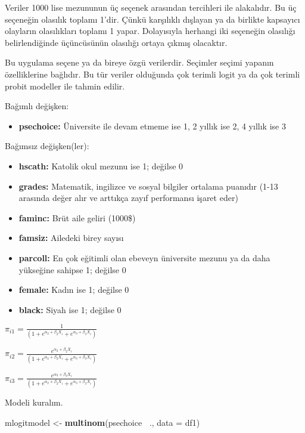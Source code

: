 \documentclass[
]{book}
\newenvironment{Shaded}{\begin{snugshade}}{\end{snugshade}}
\newcommand{\DataTypeTok}[1]{\textcolor[rgb]{0.13,0.29,0.53}{#1}}
\newcommand{\KeywordTok}[1]{\textcolor[rgb]{0.13,0.29,0.53}{\textbf{#1}}}
\newcommand{\NormalTok}[1]{#1}
\newcommand{\OperatorTok}[1]{\textcolor[rgb]{0.81,0.36,0.00}{\textbf{#1}}}
\newcommand{\StringTok}[1]{\textcolor[rgb]{0.31,0.60,0.02}{#1}}
\providecommand{\tightlist}{%
  \setlength{\itemsep}{0pt}\setlength{\parskip}{0pt}}
\begin{document}
Veriler 1000 lise mezununun üç seçenek arasından tercihleri ile alakalıdır. Bu üç seçeneğin olasılık toplamı 1'dir. Çünkü karşılıklı dışlayan ya da birlikte kapsayıcı olayların olasılıkları toplamı 1 yapar. Dolayısıyla herhangi iki seçeneğin olasılığı belirlendiğinde üçüncüsünün olasılığı ortaya çıkmış olacaktır.

Bu uygulama seçene ya da bireye özgü verilerdir. Seçimler seçimi yapanın özelliklerine bağlıdır. Bu tür veriler olduğunda çok terimli logit ya da çok terimli probit modeller ile tahmin edilir.

Bağımlı değişken:

\begin{itemize}
\tightlist
\item
  \textbf{psechoice:} Üniversite ile devam etmeme ise 1, 2 yıllık ise 2, 4 yıllık ise 3
\end{itemize}

Bağımsız değişken(ler):

\begin{itemize}
\item
  \textbf{hscath:} Katolik okul mezunu ise 1; değilse 0
\item
  \textbf{grades:} Matematik, ingilizce ve sosyal bilgiler ortalama puanıdır (1-13 arasında değer alır ve arttıkça zayıf performansı işaret eder)
\item
  \textbf{faminc:} Brüt aile geliri (1000\$)
\item
  \textbf{famsiz:} Ailedeki birey sayısı
\item
  \textbf{parcoll:} En çok eğitimli olan ebeveyn üniversite mezunu ya da daha yükseğine sahipse 1; değilse 0
\item
  \textbf{female:} Kadın ise 1; değilse 0
\item
  \textbf{black:} Siyah ise 1; değilse 0
\end{itemize}

\(\pi_{i1} = \frac{1}{(1 + e^{\alpha_2 + \beta_2X_i} + e^{\alpha_3 + \beta_3X_i})}\)

\(\pi_{i2} = \frac{e^{\alpha_2 + \beta_2X_i}}{(1 + e^{\alpha_2 + \beta_2X_i} + e^{\alpha_3 + \beta_3X_i})}\)

\(\pi_{i3} = \frac{e^{\alpha_3 + \beta_3X_i}}{(1 + e^{\alpha_2 + \beta_2X_i} + e^{\alpha_3 + \beta_3X_i})}\)

Modeli kuralım.

\begin{Shaded}
\begin{Highlighting}[]
\NormalTok{mlogitmodel <-}\StringTok{ }\KeywordTok{multinom}\NormalTok{(psechoice }\OperatorTok{~}\NormalTok{., }\DataTypeTok{data =}\NormalTok{ df1)}
\end{Highlighting}
\end{Shaded}
\end{document}
